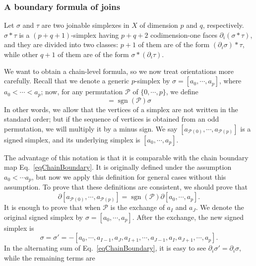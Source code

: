 \documentclass[reprint, amsmath, amssymb, showpacs, floatfix, longbibliography, aps, twocolumn, superscriptaddress, nofootinbib]{revtex4-2}
\theoremstyle{definition}
\begin{document}
\subsubsection*{A boundary formula of joins}

Let $\sigma$ and $\tau$ are two joinable simplexes in $X$ of dimension $p$ and $q$, respectively. $\sigma*\tau$ is a $(p+q+1)$-simplex having $p+q+2$ codimension-one faces $\partial_i(\sigma*\tau)$, and they are divided into two classes: $p+1$ of them are of the form $(\partial_i \sigma)*\tau$, while other $q+1$ of them are of the form $\sigma*(\partial_i\tau)$.

We want to obtain a chain-level formula, so we now treat orientations more carefully. Recall that we denote a generic $p$-simplex by $\sigma=[a_0,\cdots,a_p]$, where $a_0<\cdots <a_p$; now, for any permutation $\mathcal{P}$ of $\{0,\cdots,p\}$, we define
\begin{equation}
	[a_{\mathcal{P}(0)},\cdots,a_{\mathcal{P}(p)}]=\operatorname{sgn}(\mathcal{P})\sigma
\end{equation}
In other words, we allow that the vertices of a simplex are not written in the standard order; but if the sequence of vertices is obtained from an odd permutation, we will multiply it by a minus sign. We say $[a_{\mathcal{P}(0)},\cdots,a_{\mathcal{P}(p)}]$ is a signed simplex, and its underlying simplex is $[a_0,\cdots,a_p]$.

The advantage of this notation is that it is comparable with the chain boundary map Eq.~\eqref{eqChainBoundary}.
 It is originally defined under the assumption $a_0<\cdots a_p$, but now we apply this definition for general cases without this assumption. To prove that these definitions are consistent, we should prove that 
\begin{equation}
	\partial 	[a_{\mathcal{P}(0)},\cdots,a_{\mathcal{P}(p)}]=\operatorname{sgn}(\mathcal{P})\partial  [a_0,\cdots,a_p].
\end{equation}
It is enough to prove that when $\mathcal{P}$ is the exchange of $a_I$ and $a_J$. We denote the original signed simplex by $\sigma=[a_0,\cdots,a_p]$. After the exchange, the new signed simplex is
\begin{equation}
	\sigma=\sigma'=-[a_0,\cdots,a_{I-1},a_J,a_{I+1},\cdots,a_{J-1},a_I,a_{J+1},\cdots, a_p].
\end{equation}
In the alternating sum of Eq.~\eqref{eqChainBoundary}, it is easy to see $\partial_i\sigma'=\partial_i \sigma$, while the remaining terms are
\end{document}
